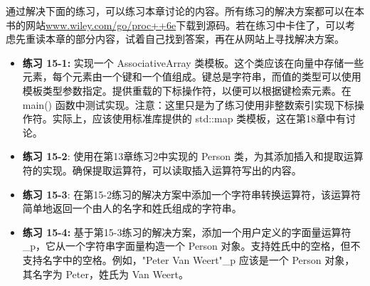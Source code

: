通过解决下面的练习，可以练习本章讨论的内容。所有练习的解决方案都可以在本书的网站\url{www.wiley.com/go/proc++6e}下载到源码。若在练习中卡住了，可以考虑先重读本章的部分内容，试着自己找到答案，再在从网站上寻找解决方案。

\begin{itemize}
\item
\textbf{练习 15-1:} 实现一个 AssociativeArray 类模板。这个类应该在向量中存储一些元素，每个元素由一个键和一个值组成。键总是字符串，而值的类型可以使用模板类型参数指定。提供重载的下标操作符，以便可以根据键检索元素。在 main() 函数中测试实现。注意：这里只是为了练习使用非整数索引实现下标操作符。实际上，应该使用标准库提供的 std::map 类模板，这在第18章中有讨论。

\item
\textbf{练习 15-2}: 使用在第13章练习2中实现的 Person 类，为其添加插入和提取运算符的实现。确保提取运算符，可以读取插入运算符写出的内容。

\item
\textbf{练习 15-3}: 在第15-2练习的解决方案中添加一个字符串转换运算符，该运算符简单地返回一个由人的名字和姓氏组成的字符串。

\item
\textbf{练习 15-4:} 基于第15-3练习的解决方案，添加一个用户定义的字面量运算符 \_p，它从一个字符串字面量构造一个 Person 对象。支持姓氏中的空格，但不支持名字中的空格。例如，"Peter Van Weert"\_p 应该是一个 Person 对象，其名字为 Peter，姓氏为 Van Weert。
\end{itemize}












